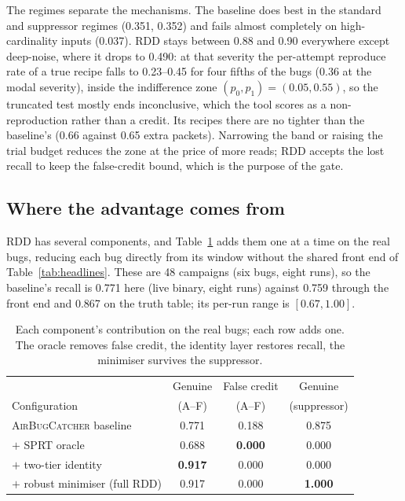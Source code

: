 The regimes separate the mechanisms. The baseline does best in the standard and
suppressor regimes (0.351, 0.352) and fails almost completely on high-cardinality
inputs (0.037). RDD stays between 0.88 and 0.90 everywhere except deep-noise, where
it drops to 0.490: at that severity the per-attempt reproduce rate of a true
recipe falls to 0.23--0.45 for four fifths of the bugs (0.36 at the modal severity),
inside the indifference zone $(p_0, p_1) =
(0.05, 0.55)$, so the truncated test mostly ends inconclusive, which the tool
scores as a non-reproduction rather than a credit. Its recipes there are no
tighter than the baseline's (0.66 against 0.65 extra packets). Narrowing the band
or raising the trial budget reduces the zone at the price of more reads; RDD
accepts the lost recall to keep the false-credit bound, which is the purpose of
the gate.

\subsection{Where the advantage comes from}\label{ssec:eval-levers}

RDD has several components, and Table~\ref{tab:levers} adds them one at a time
on the real bugs, reducing each bug directly from its window without the shared
front end of Table~\ref{tab:headlines}. These are 48 campaigns (six bugs, eight
runs), so the baseline's recall is 0.771 here (live binary, eight runs) against 0.759 through
the front end and 0.867 on the truth table; its per-run range is $[0.67, 1.00]$.

\begin{table}[!t]
\renewcommand{\arraystretch}{1.2}
\caption{Each component's contribution on the real bugs; each row adds one. The
oracle removes false credit, the identity layer restores recall, the minimiser
survives the suppressor.}
\label{tab:levers}
\centering
\setlength{\tabcolsep}{4pt}%
\begin{tabular}{@{}lccc@{}}
\toprule
 & Genuine & False credit & Genuine\\
Configuration & (A--F) & (A--F) & (suppressor)\\
\midrule
\textsc{AirBugCatcher} baseline    & 0.771 & 0.188 & 0.875\\
$+$ SPRT oracle                    & 0.688 & \textbf{0.000} & 0.000\\
$+$ two-tier identity              & \textbf{0.917} & 0.000 & 0.000\\
$+$ robust minimiser (full RDD)    & 0.917 & 0.000 & \textbf{1.000}\\
\bottomrule
\end{tabular}
\end{table}

